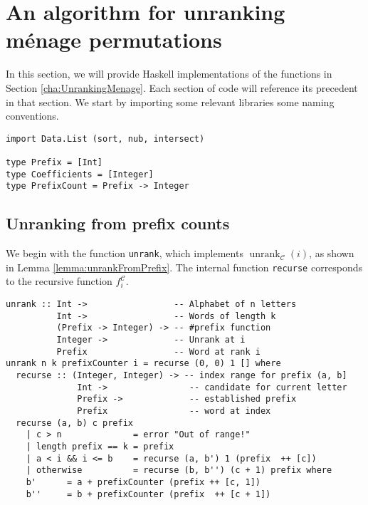 \section{An algorithm for unranking m\'enage permutations}
\label{apndx:haskell}
In this section, we will provide Haskell implementations of the functions in
Section \ref{cha:UnrankingMenage}. Each section of code will reference its
precedent in that section. We start by importing some relevant libraries
some naming conventions.

\begin{singlespace}\begin{verbatim}
import Data.List (sort, nub, intersect)

type Prefix = [Int]
type Coefficients = [Integer]
type PrefixCount = Prefix -> Integer
\end{verbatim}\end{singlespace}

\subsection{Unranking from prefix counts}

We begin with the function \texttt{unrank}, which implements
$\operatorname{unrank}_\mathcal{C}(i)$, as shown in Lemma
\ref{lemma:unrankFromPrefix}. The internal function
\texttt{recurse} corresponds to the recursive function $f_i^\mathcal{C}$.
\begin{singlespace}\begin{verbatim}
unrank :: Int ->                 -- Alphabet of n letters
          Int ->                 -- Words of length k
          (Prefix -> Integer) -> -- #prefix function
          Integer ->             -- Unrank at i
          Prefix                 -- Word at rank i
unrank n k prefixCounter i = recurse (0, 0) 1 [] where
  recurse :: (Integer, Integer) -> -- index range for prefix (a, b]
              Int ->                -- candidate for current letter
              Prefix ->             -- established prefix
              Prefix                -- word at index
  recurse (a, b) c prefix
    | c > n              = error "Out of range!"
    | length prefix == k = prefix
    | a < i && i <= b    = recurse (a, b') 1 (prefix  ++ [c])
    | otherwise          = recurse (b, b'') (c + 1) prefix where
    b'      = a + prefixCounter (prefix ++ [c, 1])
    b''     = b + prefixCounter (prefix  ++ [c + 1])
\end{verbatim}\end{singlespace}


